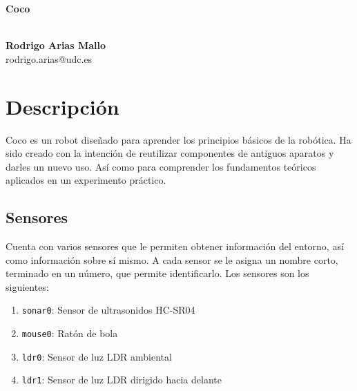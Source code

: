 \documentclass[10pt,a4paper,hidelinks,twocolumn]{article}
\begin{document}
\begin{center}
\begin{huge}
\textbf{Coco}
\end{huge}
\\[10pt]
\textbf{Rodrigo Arias Mallo}\\
rodrigo.arias@udc.es
\end{center}

\newcommand\RobotAngle{45}
\newcommand\RobotSize{2}
\newcommand\RobotRadius{4}
\newcommand\RobotThetaSonar{60.0}

\section{Descripción}
Coco es un robot diseñado para aprender los principios básicos de la robótica.
Ha sido creado con la intención de reutilizar componentes de antiguos aparatos y 
darles un nuevo uso. Así como para comprender los fundamentos teóricos
aplicados en un experimento práctico.

\subsection{Sensores}
Cuenta con varios sensores que le permiten obtener información del entorno, así
como información sobre sí mismo. A cada sensor se le asigna un nombre corto, 
terminado en un número, que permite identificarlo. Los sensores son los 
siguientes:

\begin{enumerate}
	\setlength{\parskip}{0cm}

	\item \texttt{sonar0}: Sensor de ultrasonidos HC-SR04
	\item \texttt{mouse0}: Ratón de bola
	\item \texttt{ldr0}: Sensor de luz LDR ambiental
	\item \texttt{ldr1}: Sensor de luz LDR dirigido hacia delante
\end{enumerate}

\end{document}
